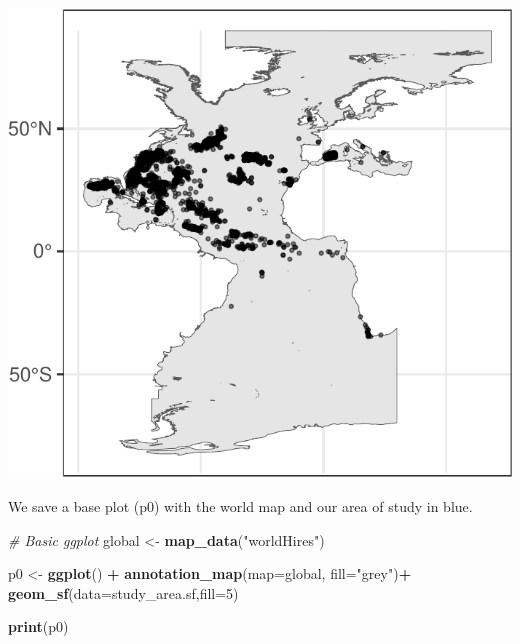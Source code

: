 \documentclass[
]{book}
\newenvironment{Shaded}{\begin{snugshade}}{\end{snugshade}}
\newcommand{\AttributeTok}[1]{\textcolor[rgb]{0.13,0.29,0.53}{#1}}
\newcommand{\CommentTok}[1]{\textcolor[rgb]{0.56,0.35,0.01}{\textit{#1}}}
\newcommand{\DecValTok}[1]{\textcolor[rgb]{0.00,0.00,0.81}{#1}}
\newcommand{\FunctionTok}[1]{\textcolor[rgb]{0.13,0.29,0.53}{\textbf{#1}}}
\newcommand{\NormalTok}[1]{#1}
\newcommand{\OtherTok}[1]{\textcolor[rgb]{0.56,0.35,0.01}{#1}}
\newcommand{\SpecialCharTok}[1]{\textcolor[rgb]{0.81,0.36,0.00}{\textbf{#1}}}
\newcommand{\StringTok}[1]{\textcolor[rgb]{0.31,0.60,0.02}{#1}}
\begin{document}
\includegraphics{_main_files/figure-latex/unnamed-chunk-17-1.pdf}

We save a base plot (p0) with the world map and our area of study in blue.

\begin{Shaded}
\begin{Highlighting}[]
\CommentTok{\# Basic ggplot}
\NormalTok{global }\OtherTok{\textless{}{-}} \FunctionTok{map\_data}\NormalTok{(}\StringTok{"worldHires"}\NormalTok{)}

\NormalTok{p0 }\OtherTok{\textless{}{-}} \FunctionTok{ggplot}\NormalTok{() }\SpecialCharTok{+} 
  \FunctionTok{annotation\_map}\NormalTok{(}\AttributeTok{map=}\NormalTok{global, }\AttributeTok{fill=}\StringTok{"grey"}\NormalTok{)}\SpecialCharTok{+}
  \FunctionTok{geom\_sf}\NormalTok{(}\AttributeTok{data=}\NormalTok{study\_area.sf,}\AttributeTok{fill=}\DecValTok{5}\NormalTok{)}

\FunctionTok{print}\NormalTok{(p0)}
\end{Highlighting}
\end{Shaded}
\end{document}
